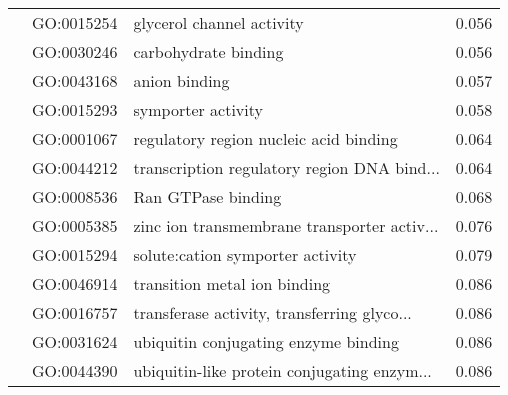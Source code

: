\begin{longtable}{lllr}
   & GO:0015254 &                    glycerol channel activity &         0.056 \\
   & GO:0030246 &                         carbohydrate binding &         0.056 \\
   & GO:0043168 &                                anion binding &         0.057 \\
   & GO:0015293 &                           symporter activity &         0.058 \\
   & GO:0001067 &       regulatory region nucleic acid binding &         0.064 \\
   & GO:0044212 &  transcription regulatory region DNA bind... &         0.064 \\
   & GO:0008536 &                           Ran GTPase binding &         0.068 \\
   & GO:0005385 &  zinc ion transmembrane transporter activ... &         0.076 \\
   & GO:0015294 &             solute:cation symporter activity &         0.079 \\
   & GO:0046914 &                 transition metal ion binding &         0.086 \\
   & GO:0016757 &  transferase activity, transferring glyco... &         0.086 \\
   & GO:0031624 &         ubiquitin conjugating enzyme binding &         0.086 \\
   & GO:0044390 &  ubiquitin-like protein conjugating enzym... &         0.086 \\
\end{longtable}
